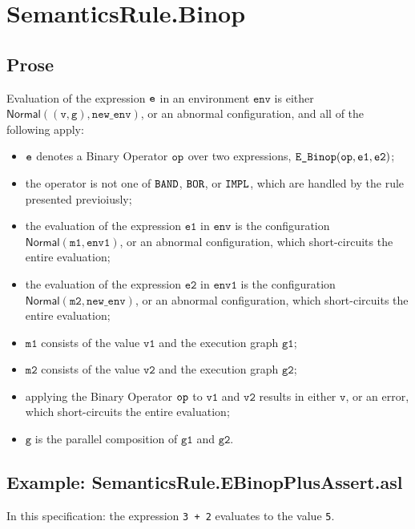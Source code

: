 \documentclass{book}
\newcommand\ProseOrAbnormal[0]{or an abnormal configuration, which short-circuits the entire evaluation}
\newcommand\Normal[0]{\textsf{Normal}}
\newcommand\newenv[0]{\texttt{new\_env}}
\newcommand\env[0]{\texttt{env}}
\newcommand\envone[0]{\texttt{env1}}
\newcommand\vg[0]{\texttt{g}}
\newcommand\vv[0]{\texttt{v}}
\newcommand\vvone[0]{\texttt{v1}}
\newcommand\vvtwo[0]{\texttt{v2}}
\newcommand\vmone[0]{\texttt{m1}}
\newcommand\vmtwo[0]{\texttt{m2}}
\newcommand\veone[0]{\texttt{e1}}
\newcommand\vetwo[0]{\texttt{e2}}
\newcommand\vgone[0]{\texttt{g1}}
\newcommand\vgtwo[0]{\texttt{g2}}
\begin{document}
\section{SemanticsRule.Binop \label{sec:SemanticsRule.Binop}}

  \subsection{Prose}
  Evaluation of the expression $\texttt{e}$ in an environment $\env$ is either $\Normal((\vv, \vg), \newenv)$,
  or an abnormal configuration, and all of the following apply:
  \begin{itemize}
    \item $\texttt{e}$ denotes a Binary Operator $\texttt{op}$ over two expressions, $\texttt{E\_Binop}(\op, \veone, \vetwo)$;
    \item the operator is not one of $\texttt{BAND}$, $\texttt{BOR}$, or $\texttt{IMPL}$, which are handled by the
    rule presented previoiusly;
    \item the evaluation of the expression $\veone$ in $\env$ is the configuration $\Normal(\vmone, \envone)$,
    \ProseOrAbnormal;
    \item the evaluation of the expression $\vetwo$ in $\envone$ is the configuration \\ $\Normal(\vmtwo, \newenv)$,
    \ProseOrAbnormal;
    \item $\vmone$ consists of the value $\vvone$ and the execution graph $\vgone$;
    \item $\vmtwo$ consists of the value $\vvtwo$ and the execution graph $\vgtwo$;
    \item applying the Binary Operator $\texttt{op}$ to $\vvone$ and $\vvtwo$ results in either $\vv$,
    or an error, which short-circuits the entire evaluation;
    \item $\vg$ is the parallel composition of $\vgone$ and $\vgtwo$.
  \end{itemize}

  \subsection{Example: SemanticsRule.EBinopPlusAssert.asl}
    In this specification:
    the expression \texttt{3 + 2} evaluates to the value \texttt{5}.
\end{document}
